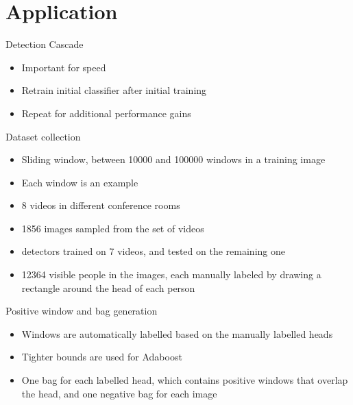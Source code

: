 \documentclass{beamer}
\begin{document}
	\section{Application}

	\begin{frame}{Detection Cascade}
		\begin{itemize}
			\item Important for speed
			\item Retrain initial classifier after initial training
			\item Repeat for additional performance gains
		\end{itemize}

	\end{frame}

	\begin{frame}{Dataset collection}
			\begin{itemize}
				\item Sliding window, between 10000 and 100000 windows in a training image
				\item Each window is an example
				\item 8 videos in different conference rooms
				\item 	1856 images sampled from the set of videos
				\item 	detectors trained on 7 videos, and tested on the remaining one
				\item 	12364 visible people in the images, each manually labeled by drawing a rectangle around the head of each person
			\end{itemize}
	\end{frame}	

	\begin{frame}{Positive window and bag generation}
			\begin{itemize}
				\item Windows are automatically labelled based on the manually labelled heads
				\item Tighter bounds are used for Adaboost
				\item One bag for each labelled head, which contains positive windows that overlap the head, and one negative bag for each image
			\end{itemize}
	\end{frame}
\end{document}
